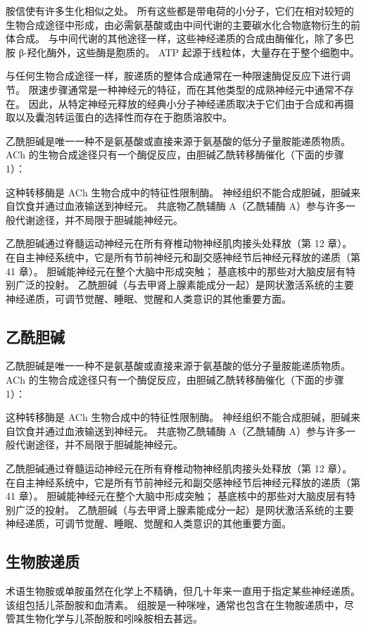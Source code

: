 胺信使有许多生化相似之处。 所有这些都是带电荷的小分子，它们在相对较短的生物合成途径中形成，由必需氨基酸或由中间代谢的主要碳水化合物底物衍生的前体合成。 与中间代谢的其他途径一样，这些神经递质的合成由酶催化，除了多巴胺 β-羟化酶外，这些酶是胞质的。 ATP 起源于线粒体，大量存在于整个细胞中。

与任何生物合成途径一样，胺递质的整体合成通常在一种限速酶促反应下进行调节。 限速步骤通常是一种神经元的特征，而在其他类型的成熟神经元中通常不存在。 因此，从特定神经元释放的经典小分子神经递质取决于它们由于合成和再摄取以及囊泡转运蛋白的选择性而存在于胞质溶胶中。

乙酰胆碱是唯一一种不是氨基酸或直接来源于氨基酸的低分子量胺能递质物质。 ACh 的生物合成途径只有一个酶促反应，由胆碱乙酰转移酶催化（下面的步骤 1）：

这种转移酶是 ACh 生物合成中的特征性限制酶。 神经组织不能合成胆碱，胆碱来自饮食并通过血液输送到神经元。 共底物乙酰辅酶 A（乙酰辅酶 A）参与许多一般代谢途径，并不局限于胆碱能神经元。

乙酰胆碱通过脊髓运动神经元在所有脊椎动物神经肌肉接头处释放（第 12 章）。 在自主神经系统中，它是所有节前神经元和副交感神经节后神经元释放的递质（第 41 章）。 胆碱能神经元在整个大脑中形成突触； 基底核中的那些对大脑皮层有特别广泛的投射。 乙酰胆碱（与去甲肾上腺素能成分一起）是网状激活系统的主要神经递质，可调节觉醒、睡眠、觉醒和人类意识的其他重要方面。


\subsection{乙酰胆碱}
乙酰胆碱是唯一一种不是氨基酸或直接来源于氨基酸的低分子量胺能递质物质。 ACh 的生物合成途径只有一个酶促反应，由胆碱乙酰转移酶催化（下面的步骤 1）：

这种转移酶是 ACh 生物合成中的特征性限制酶。 神经组织不能合成胆碱，胆碱来自饮食并通过血液输送到神经元。 共底物乙酰辅酶 A（乙酰辅酶 A）参与许多一般代谢途径，并不局限于胆碱能神经元。

乙酰胆碱通过脊髓运动神经元在所有脊椎动物神经肌肉接头处释放（第 12 章）。 在自主神经系统中，它是所有节前神经元和副交感神经节后神经元释放的递质（第 41 章）。 胆碱能神经元在整个大脑中形成突触； 基底核中的那些对大脑皮层有特别广泛的投射。 乙酰胆碱（与去甲肾上腺素能成分一起）是网状激活系统的主要神经递质，可调节觉醒、睡眠、觉醒和人类意识的其他重要方面。



\subsection{生物胺递质}
术语生物胺或单胺虽然在化学上不精确，但几十年来一直用于指定某些神经递质。 该组包括儿茶酚胺和血清素。 组胺是一种咪唑，通常也包含在生物胺递质中，尽管其生物化学与儿茶酚胺和吲哚胺相去甚远。

